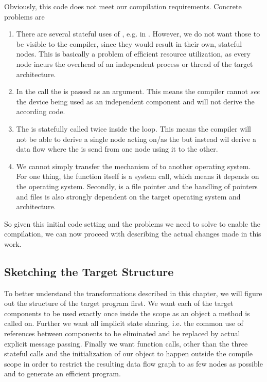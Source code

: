  Obviously, this code does not meet our compilation requirements. Concrete problems are 
\begin{enumerate}
    \item There are several stateful uses of , e.g. in . However, we do not want those to be visible to the compiler, since they would result in their own, stateful nodes. This is basically a problem of efficient resource utilization, as every node incurs the overhead of an independent process or thread of the target architecture.  
    \item In the call  the  is passed as an argument. This means the compiler cannot \emph{see} the device being used as an independent component and will not derive the according code.
    \item The  is statefully called twice inside the loop. This means the compiler will not be able to derive a single node acting on/as the  but instead wil derive a data flow where the  is send from one node using it to the other. 
    \item We cannot simply transfer the mechanism of  to another operating system. For one thing, the function itself is a system call, which means it depends on the operating system. Secondly,  is a file pointer and the handling of pointers and files is also strongly dependent on the target operating system and architecture.
\end{enumerate}

So given this initial code setting and the problems we need to solve to enable the compilation, we can now proceed with describing the actual changes made in this work. 

\subsection{Sketching the Target Structure}

To better understand the transformations described in this chapter, we will figure out the structure of the target program first. We want each of the target components to be used exactly once inside the scope as an object a method is called on. Further we want all implicit state sharing, i.e. the common use of references between components to be eliminated and be replaced by actual explicit message passing. Finally we want function calls, other than the three stateful calls and the initialization of our object to happen outside the compile scope in order to restrict the resulting data flow graph to as few nodes as possible and to generate an efficient program. \\

